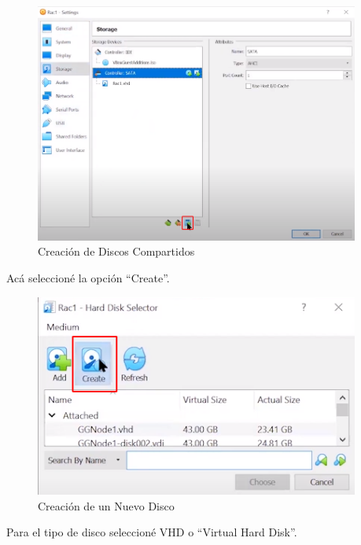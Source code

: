 \documentclass{article}
\begin{document}
\begin{figure}[H]
		\begin{center}
			\includegraphics[width=0.95\textwidth]{vm_shared_disk_creation.png}
		\end{center}
		\caption{Creación de Discos Compartidos}
\end{figure}

Acá seleccioné la opción ``Create''.

\begin{figure}[H]
		\begin{center}
			\includegraphics[width=0.95\textwidth]{vm_shared_disk_create.png}
		\end{center}
		\caption{Creación de un Nuevo Disco}
\end{figure}

Para el tipo de disco seleccioné VHD o ``Virtual Hard Disk''.
\end{document}
